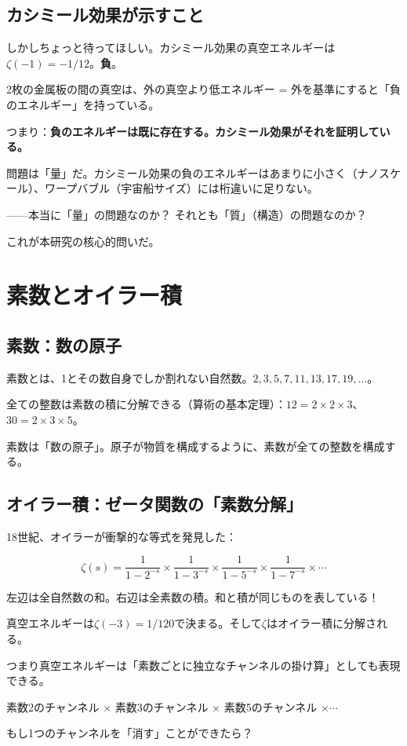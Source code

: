 \documentclass[12pt,a4paper]{article}
\begin{document}
\subsection{カシミール効果が示すこと}

しかしちょっと待ってほしい。カシミール効果の真空エネルギーは$\zeta(-1) = -1/12$。\textbf{負}。

2枚の金属板の間の真空は、外の真空より低エネルギー = 外を基準にすると「負のエネルギー」を持っている。

つまり：\textbf{負のエネルギーは既に存在する。カシミール効果がそれを証明している。}

問題は「量」だ。カシミール効果の負のエネルギーはあまりに小さく（ナノスケール）、ワープバブル（宇宙船サイズ）には桁違いに足りない。

——本当に「量」の問題なのか？ それとも「質」（構造）の問題なのか？

これが本研究の核心的問いだ。

\section{素数とオイラー積}

\subsection{素数：数の原子}

素数とは、1とその数自身でしか割れない自然数。$2, 3, 5, 7, 11, 13, 17, 19, \ldots$。

全ての整数は素数の積に分解できる（算術の基本定理）：$12 = 2 \times 2 \times 3$、$30 = 2 \times 3 \times 5$。

素数は「数の原子」。原子が物質を構成するように、素数が全ての整数を構成する。

\subsection{オイラー積：ゼータ関数の「素数分解」}

18世紀、オイラーが衝撃的な等式を発見した：

\begin{mathbox}[オイラー積]
$$\zeta(s) = \frac{1}{1-2^{-s}} \times \frac{1}{1-3^{-s}} \times \frac{1}{1-5^{-s}} \times \frac{1}{1-7^{-s}} \times \cdots$$

左辺は全自然数の和。右辺は全素数の積。和と積が同じものを表している！
\end{mathbox}

\begin{storybox}[これが意味すること]
真空エネルギーは$\zeta(-3) = 1/120$で決まる。そして$\zeta$はオイラー積に分解される。

つまり真空エネルギーは「素数ごとに独立なチャンネルの掛け算」としても表現できる。

素数2のチャンネル $\times$ 素数3のチャンネル $\times$ 素数5のチャンネル $\times \cdots$

もし1つのチャンネルを「消す」ことができたら？
\end{storybox}
\end{document}
